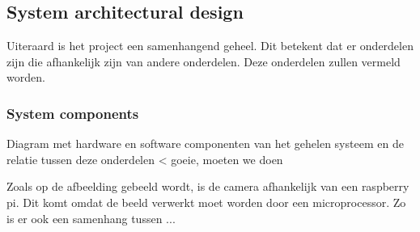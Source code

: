     \newpage
\subsection{System architectural design}
Uiteraard is het project een samenhangend geheel. Dit betekent dat er onderdelen zijn die afhankelijk zijn van andere onderdelen. Deze onderdelen zullen vermeld worden.

\subsubsection*{System components}
Diagram met hardware en software componenten van het gehelen systeem en de relatie tussen deze onderdelen < goeie, moeten we doen

Zoals op de afbeelding gebeeld wordt, is de camera afhankelijk van een raspberry pi. Dit komt omdat de beeld verwerkt moet worden door een microprocessor. Zo is er ook een samenhang tussen ...
